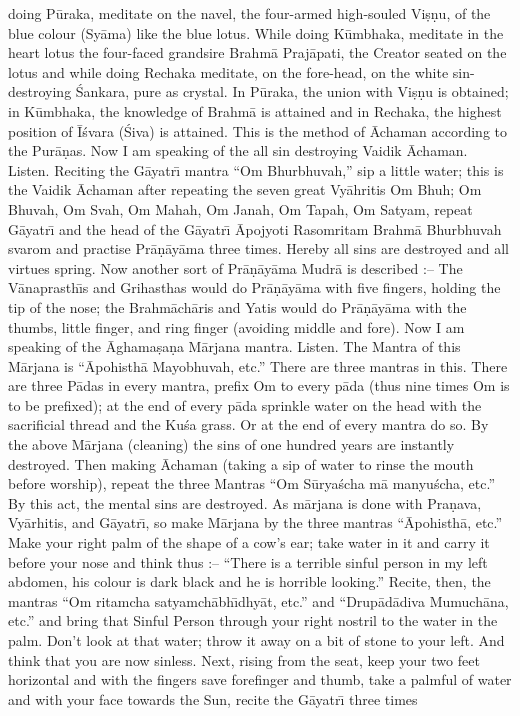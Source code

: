 doing P\=uraka, meditate on the navel, the four-armed high-souled Vi\d{s}\d{n}u, of the blue colour (Sy\=ama) like the blue lotus. While doing K\=umbhaka, meditate in the heart lotus the four-faced grandsire Brahm\=a Praj\=apati, the Creator seated on the lotus and while doing Rechaka meditate, on the fore-head, on the white sin-destroying \'Sankara, pure as crystal. In P\=uraka, the union with Vi\d{s}\d{n}u is obtained; in K\=umbhaka, the knowledge of Brahm\=a is attained and in Rechaka, the highest position of \=I\'svara (\'Siva) is attained. This is the method of \=Achaman according to the Pur\=a\d{n}as. Now I am speaking of the all sin destroying Vaidik \=Achaman. Listen. Reciting the G\=ayatr\={\i} mantra ``Om Bhurbhuvah,'' sip a little water; this is the Vaidik \=Achaman after repeating the seven great Vy\=ahritis Om Bhuh; Om Bhuvah, Om Svah, Om Mahah, Om Janah, Om Tapah, Om Satyam, repeat G\=ayatr\={\i} and the head of the G\=ayatr\={\i} \=Apojyoti Rasomritam Brahm\=a Bhurbhuvah svarom and practise Pr\=a\d{n}\=ay\=ama three times. Hereby all sins are destroyed and all virtues spring. Now another sort of Pr\=a\d{n}\=ay\=ama Mudr\=a is described :-- The V\=anaprasth\={\i}s and Grihasthas would do Pr\=a\d{n}\=ay\=ama with five fingers, holding the tip of the nose; the Brahm\=ach\=aris and Yatis would do Pr\=a\d{n}\=ay\=ama with the thumbs, little finger, and ring finger (avoiding middle and fore). Now I am speaking of the \=Aghama\d{s}a\d{n}a M\=arjana mantra. Listen. The Mantra of this M\=arjana is ``\=Apohisth\=a Mayobhuvah, etc.'' There are three mantras in this. There are three P\=adas in every mantra, prefix Om to every p\=ada (thus nine times Om is to be prefixed); at the end of every p\=ada sprinkle water on the head with the sacrificial thread and the Ku\'sa grass. Or at the end of every mantra do so. By the above M\=arjana (cleaning) the sins of one hundred years are instantly destroyed. Then making \=Achaman (taking a sip of water to rinse the mouth before worship), repeat the three Mantras ``Om S\=urya\'scha m\=a manyu\'scha, etc.'' By this act, the mental sins are destroyed. As m\=arjana is done with Pra\d{n}ava, Vy\=arhitis, and G\=ayatr\={\i}, so make M\=arjana by the three mantras ``\=Apohisth\=a, etc.'' Make your right palm of the shape of a cow's ear; take water in it and carry it before your nose and think thus :-- ``There is a terrible sinful person in my left abdomen, his colour is dark black and he is horrible looking.'' Recite, then, the mantras ``Om ritamcha satyamch\=abh\={\i}dhy\=at, etc.'' and ``Drup\=ad\=adiva Mumuch\=ana, etc.'' and bring that Sinful Person through your right nostril to the water in the palm. Don't look at that water; throw it away on a bit of stone to your left. And think that you are now sinless. Next, rising from the seat, keep your two feet horizontal and with the fingers save forefinger and thumb, take a palmful of water and with your face towards the Sun, recite the G\=ayatr\={\i} three times

